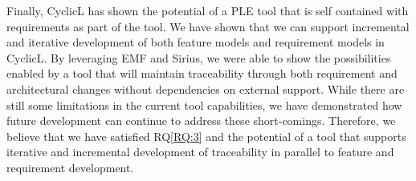 Finally, CyclicL has shown the potential of a \ac{PLE} tool that is self contained with requirements as part of the tool. We have shown that we can support incremental and iterative development of both feature models and requirement models in CyclicL. By leveraging \ac{EMF} and Sirius, we were able to show the possibilities enabled by a tool that will maintain traceability through both requirement and architectural changes without dependencies on external support. While there are still some limitations in the current tool capabilities, we have demonstrated how future development can continue to address these short-comings. Therefore, we believe that we have satisfied RQ\ref{RQ:3} and the potential of a tool that supports iterative and incremental development of traceability in parallel to feature and requirement development.


